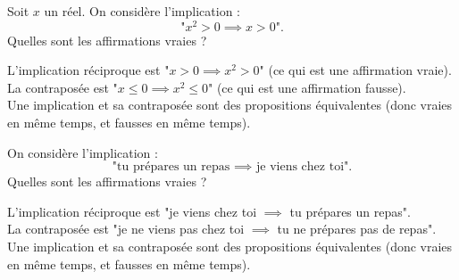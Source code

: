 \begin{question}
Soit $x$ un réel. On considère l'implication :
$$\text{"$x^2>0\implies x>0$".}$$
Quelles sont les affirmations vraies ?
\begin{answers}
\end{answers}
\begin{explanations}
L'implication réciproque est "$x>0\implies x^2>0$" (ce qui est une affirmation vraie). \\
La contraposée est "$x\le 0\implies x^2\le 0$" (ce qui est une affirmation fausse).\\
Une implication et sa contraposée sont des propositions équivalentes (donc vraies en même temps, et fausses en même temps). \\
\end{explanations}
\end{question}


\begin{question}
On considère l'implication :
$$\text{"tu prépares un repas $\implies$ je viens chez toi".}$$
Quelles sont les affirmations vraies ?
\begin{answers}
\end{answers}
\begin{explanations}
L'implication réciproque est "je viens chez toi $\implies$ tu prépares un repas". \\
La contraposée est "je ne viens pas chez toi $\implies$ tu ne prépares pas de repas".\\
Une implication et sa contraposée sont des propositions équivalentes (donc vraies en même temps, et fausses en même temps). \\
\end{explanations}
\end{question}


